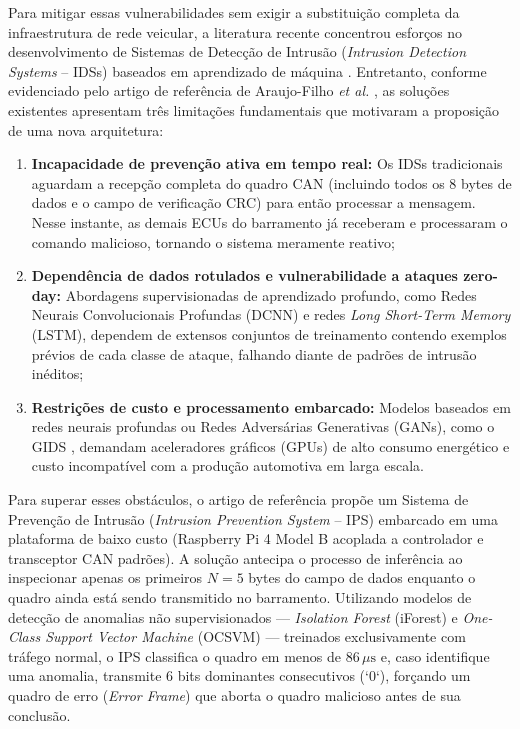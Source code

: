 \documentclass[conference]{IEEEtran}
\begin{document}
Para mitigar essas vulnerabilidades sem exigir a substituição completa da infraestrutura de rede veicular, a literatura recente concentrou esforços no desenvolvimento de Sistemas de Detecção de Intrusão (\textit{Intrusion Detection Systems} -- IDSs) baseados em aprendizado de máquina \cite{seo2018gids, song2020invehicle, yang2021mth}. Entretanto, conforme evidenciado pelo artigo de referência de Araujo-Filho \textit{et al.} \cite{araujo2021efficient}, as soluções existentes apresentam três limitações fundamentais que motivaram a proposição de uma nova arquitetura:
\begin{enumerate}
    \item \textbf{Incapacidade de prevenção ativa em tempo real:} Os IDSs tradicionais aguardam a recepção completa do quadro CAN (incluindo todos os 8 bytes de dados e o campo de verificação CRC) para então processar a mensagem. Nesse instante, as demais ECUs do barramento já receberam e processaram o comando malicioso, tornando o sistema meramente reativo;
    \item \textbf{Dependência de dados rotulados e vulnerabilidade a ataques zero-day:} Abordagens supervisionadas de aprendizado profundo, como Redes Neurais Convolucionais Profundas (DCNN) \cite{song2020invehicle} e redes \textit{Long Short-Term Memory} (LSTM), dependem de extensos conjuntos de treinamento contendo exemplos prévios de cada classe de ataque, falhando diante de padrões de intrusão inéditos;
    \item \textbf{Restrições de custo e processamento embarcado:} Modelos baseados em redes neurais profundas ou Redes Adversárias Generativas (GANs), como o GIDS \cite{seo2018gids}, demandam aceleradores gráficos (GPUs) de alto consumo energético e custo incompatível com a produção automotiva em larga escala.
\end{enumerate}

Para superar esses obstáculos, o artigo de referência \cite{araujo2021efficient} propõe um Sistema de Prevenção de Intrusão (\textit{Intrusion Prevention System} -- IPS) embarcado em uma plataforma de baixo custo (Raspberry Pi 4 Model B acoplada a controlador e transceptor CAN padrões). A solução antecipa o processo de inferência ao inspecionar apenas os primeiros $N = 5$ bytes do campo de dados enquanto o quadro ainda está sendo transmitido no barramento. Utilizando modelos de detecção de anomalias não supervisionados — \textit{Isolation Forest} (iForest) \cite{liu2008isolation} e \textit{One-Class Support Vector Machine} (OCSVM) \cite{scholkopf2001estimating} — treinados exclusivamente com tráfego normal, o IPS classifica o quadro em menos de $86\,\mu\text{s}$ e, caso identifique uma anomalia, transmite 6 bits dominantes consecutivos (`0`), forçando um quadro de erro (\textit{Error Frame}) que aborta o quadro malicioso antes de sua conclusão.
\end{document}
